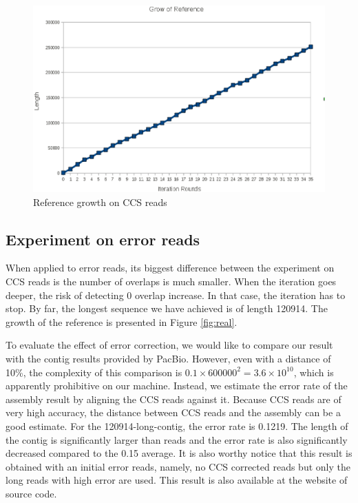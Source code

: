 \documentclass{article}
\begin{document}
\begin{figure}[t]
    \includegraphics[width=12.5cm, keepaspectratio=true]{ccs.eps}
    \caption{\label{fig:ccs}Reference growth on CCS reads}
\end{figure}

\subsection{Experiment on error reads}

When applied to error reads, its biggest difference between the experiment on
CCS reads is the number of overlaps is much smaller. When the iteration goes
deeper, the risk of detecting 0 overlap increase. In that case, the iteration
has to stop. By far, the longest sequence we have achieved is of length 120914.
The growth of the reference is presented in Figure \ref{fig:real}. 

To evaluate the effect of error correction, we would like to compare our result
with the contig results provided by PacBio. However, even with a distance of
10\%, the complexity of this comparison is $0.1 \times 600000^2 = 3.6 \times
10^{10}$, which is apparently prohibitive on our machine. Instead, we estimate
the error rate of the assembly result by aligning the CCS reads against it.
Because CCS reads are of very high accuracy, the distance between CCS reads and
the assembly can be a good estimate. For the 120914-long-contig, the error rate
is 0.1219. The length of the contig is significantly larger than reads and the
error rate is also significantly decreased compared to the 0.15 average. It is
also worthy notice that this result is obtained with an initial error reads,
     namely, no CCS corrected reads but only the long reads with high error are
     used. This result is also available at the website of source code. 
\end{document}
